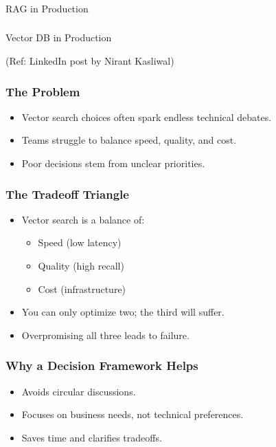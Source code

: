 \begin{frame}[fragile]\frametitle{}
\begin{center}
{\Large RAG in Production}
\end{center}
\end{frame}

\begin{frame}[fragile]\frametitle{}
\begin{center}
{\Large Vector DB in Production}

{\tiny (Ref: LinkedIn post by Nirant Kasliwal)}
\end{center}
\end{frame}


\begin{frame}[fragile]\frametitle{The Problem}
\begin{itemize}
    \item Vector search choices often spark endless technical debates.
    \item Teams struggle to balance speed, quality, and cost.
    \item Poor decisions stem from unclear priorities.
\end{itemize}
\end{frame}

\begin{frame}[fragile]\frametitle{The Tradeoff Triangle}
\begin{itemize}
    \item Vector search is a balance of:
    \begin{itemize}
        \item Speed (low latency)
        \item Quality (high recall)
        \item Cost (infrastructure)
    \end{itemize}
    \item You can only optimize two; the third will suffer.
    \item Overpromising all three leads to failure.
\end{itemize}
\end{frame}

\begin{frame}[fragile]\frametitle{Why a Decision Framework Helps}
\begin{itemize}
    \item Avoids circular discussions.
    \item Focuses on business needs, not technical preferences.
    \item Saves time and clarifies tradeoffs.
\end{itemize}
\end{frame}

